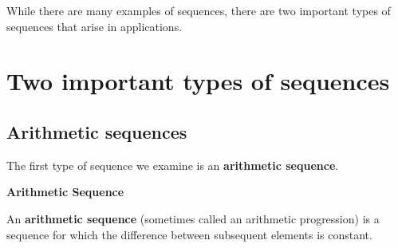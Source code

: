\documentclass{ximera}
\begin{document}
While there are many examples of sequences, there are two important types of sequences that arise in applications.
















\section*{Two important types of sequences}

\subsection*{Arithmetic sequences}

The first type of sequence we examine is an \textbf{\textcolor{purple!85!blue}{arithmetic sequence}}.  

\begin{definition}  \textbf{\textcolor{green!50!black}{Arithmetic Sequence}} 


  An \textbf{arithmetic sequence} (sometimes called an arithmetic
  progression) is a sequence for which the
  difference between subsequent elements is constant.
\end{definition}
\end{document}
